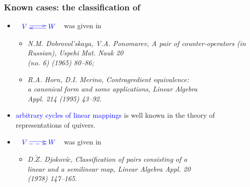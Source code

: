 \documentclass[usenames,dvipsnames]{beamer}
\begin{document}
\begin{frame}

\frametitle{ \alert{Known cases:} the classification of}
\vspace{-0.5cm}

\begin{itemize}
  \item  $
          \begin{array}{ll}
\textcolor{blue}{\xymatrix{
 {V}
 \ar@<0.4ex>[r]
 &{W}
 \ar@<0.4ex>@{->}[l]}}
          \end{array}
$ was given in
\medskip
\begin{itemize}
  \item {\it \alert{N.M. Dobrovol'skaya, V.A. Ponomarev}, A pair of
counter-operators (in Russian), Uspehi Mat. Nauk 20\\
 (no. 6) (1965) 80--86;}
  \item {\it \alert{R.A. Horn, D.I. Merino}, Contragredient equivalence:\\
a canonical form and some applications, Linear Algebra \\
Appl. 214 (1995) 43--92.}
\end{itemize}
\medskip
   \item \textcolor{blue}{arbitrary cycles of linear mappings} is well known in the theory of representations of quivers.
   \medskip
  \item  $
          \begin{array}{ll}
\textcolor{blue}{\xymatrix{
 {V}
 \ar@<0.4ex>[r]
 &{W}
 \ar@<0.4ex>@{<--}[l]}}
          \end{array}
$ was given in
\medskip
\begin{itemize}
  \item
{\it\alert{D.$\check{Z}$. Djokovi$\acute{c}$}, Classification of pairs consisting of a\\
linear and a semilinear map, Linear Algebra Appl. 20\\
(1978) 147--165.}
\end{itemize}
\end{itemize}
\end{frame}
\end{document}
